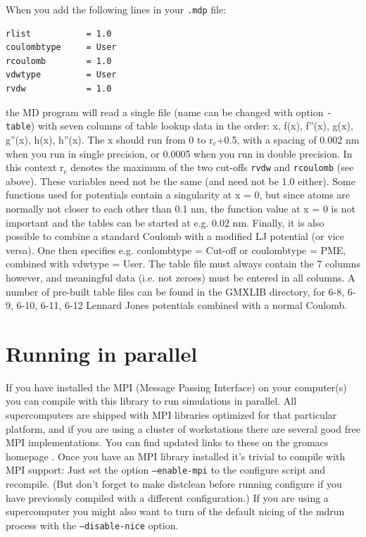 When you add the following lines in your {\tt .mdp} file:
\begin{verbatim}
rlist           = 1.0
coulombtype     = User
rcoulomb        = 1.0
vdwtype         = User
rvdw            = 1.0
\end{verbatim}
the MD program will read a single file (name can be changed with
option {\tt -table}) with seven columns of table lookup data in the
order: x, f(x), f''(x), g(x), g''(x), h(x), h''(x).  The x should run
from 0 to r$_c$+0.5, with a spacing of 0.002 nm when you run in single
precision, or 0.0005 when you run in double precision.  In this
context r$_c$ denotes the maximum of the two cut-offs {\tt rvdw} and
{\tt rcoulomb} (see above). These variables need not be the same (and
need not be 1.0 either).  Some functions used for potentials contain a
singularity at x = 0, but since atoms are normally not closer to each
other than 0.1 nm, the function value at x = 0 is not important and
the tables can be started at e.g. 0.02 nm.  Finally, it is also
possible to combine a standard Coulomb with a modified LJ potential
(or vice versa). One then specifies e.g. coulombtype = Cut-off or
coulombtype = PME, combined with vdwtype = User.  The table file must
always contain the 7 columns however, and meaningful data (i.e. not
zeroes) must be entered in all columns.  A number of pre-built table
files can be found in the GMXLIB directory, for 6-8, 6-9, 6-10, 6-11, 6-12
Lennard Jones potentials combined with a normal Coulomb.


\section{Running {\gromacs} in parallel}
If you have installed the MPI (Message Passing Interface) on your computer(s)
you can compile {\gromacs} with this library to run simulations in parallel. 
All supercomputers are shipped with MPI libraries optimized for 
that particular platform, and if you are using a cluster of workstations
there are several good free MPI implementations. You can find updated links
to these on the gromacs homepage {\wwwpage}. Once you have an MPI library
installed it's trivial to compile {\gromacs} with MPI support: Just set
the option {\tt --enable-mpi} to the configure script and recompile.
(But don't forget to make distclean before running configure if you have
previously compiled with a different configuration.) If you are using a 
supercomputer you might also want to turn of the default nicing of the
mdrun process with the {\tt --disable-nice} option.

